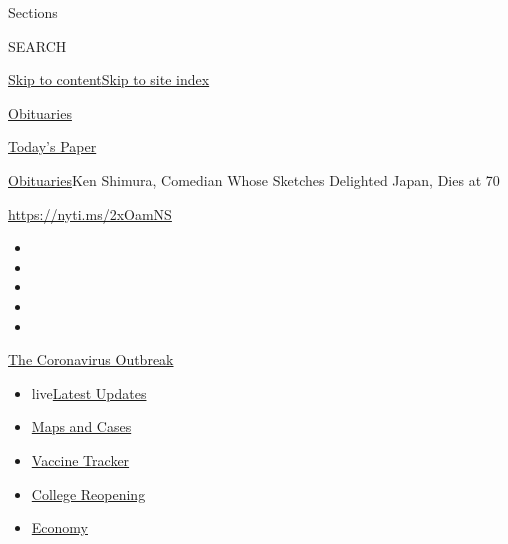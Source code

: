 Sections

SEARCH

\protect\hyperlink{site-content}{Skip to
content}\protect\hyperlink{site-index}{Skip to site index}

\href{https://www.nytimes.com/section/obituaries}{Obituaries}

\href{https://myaccount.nytimes.com/auth/login?response_type=cookie\&client_id=vi}{}

\href{https://www.nytimes.com/section/todayspaper}{Today's Paper}

\href{/section/obituaries}{Obituaries}\textbar{}Ken Shimura, Comedian
Whose Sketches Delighted Japan, Dies at 70

\url{https://nyti.ms/2xOamNS}

\begin{itemize}
\item
\item
\item
\item
\item
\end{itemize}

\href{https://www.nytimes.com/news-event/coronavirus?action=click\&pgtype=Article\&state=default\&region=TOP_BANNER\&context=storylines_menu}{The
Coronavirus Outbreak}

\begin{itemize}
\tightlist
\item
  live\href{https://www.nytimes.com/2020/08/03/world/coronavirus-covid-19.html?action=click\&pgtype=Article\&state=default\&region=TOP_BANNER\&context=storylines_menu}{Latest
  Updates}
\item
  \href{https://www.nytimes.com/interactive/2020/us/coronavirus-us-cases.html?action=click\&pgtype=Article\&state=default\&region=TOP_BANNER\&context=storylines_menu}{Maps
  and Cases}
\item
  \href{https://www.nytimes.com/interactive/2020/science/coronavirus-vaccine-tracker.html?action=click\&pgtype=Article\&state=default\&region=TOP_BANNER\&context=storylines_menu}{Vaccine
  Tracker}
\item
  \href{https://www.nytimes.com/2020/08/02/us/covid-college-reopening.html?action=click\&pgtype=Article\&state=default\&region=TOP_BANNER\&context=storylines_menu}{College
  Reopening}
\item
  \href{https://www.nytimes.com/live/2020/08/03/business/stock-market-today-coronavirus?action=click\&pgtype=Article\&state=default\&region=TOP_BANNER\&context=storylines_menu}{Economy}
\end{itemize}

